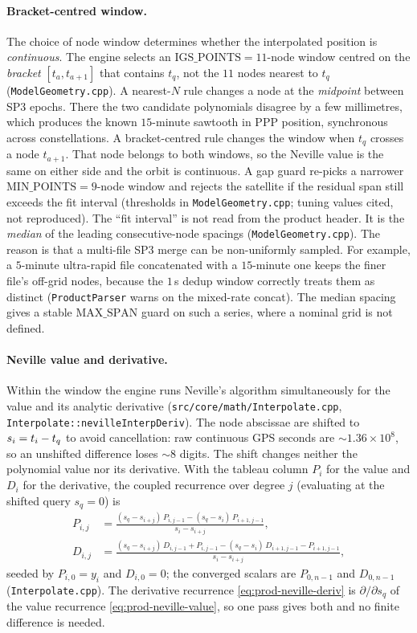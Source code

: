 \documentclass[main.tex]{subfiles}
\begin{document}
\paragraph{Bracket-centred window.}
The choice of node window determines whether the interpolated position
is \emph{continuous}.  The engine selects an
$\mathrm{IGS\_POINTS}=11$-node window centred on the \emph{bracket}
$[t_a,t_{a+1}]$ that contains $t_q$, not the $11$ nodes nearest to $t_q$
(\texttt{ModelGeometry.cpp}).  A nearest-$N$ rule changes a node at the
\emph{midpoint} between SP3 epochs.  There the two candidate polynomials
disagree by a few millimetres, which produces the known $15$-minute
sawtooth in PPP position, synchronous across constellations.  A
bracket-centred rule changes the window when $t_q$ crosses a node
$t_{a+1}$.  That node belongs to both windows, so the Neville value is
the same on either side and the orbit is continuous.  A gap guard
re-picks a narrower $\mathrm{MIN\_POINTS}=9$-node window and rejects
the satellite if the residual span still exceeds the fit interval
(thresholds in \texttt{ModelGeometry.cpp}; tuning values cited, not
reproduced).  The ``fit interval'' is not read from the product header.
It is the \emph{median} of the leading consecutive-node spacings
(\texttt{ModelGeometry.cpp}).  The reason is that a multi-file SP3 merge
can be non-uniformly sampled.  For example, a $5$-minute ultra-rapid
file concatenated with a $15$-minute one keeps the finer file's off-grid
nodes, because the $1$\,s dedup window correctly treats them as distinct
(\texttt{ProductParser} warns on the mixed-rate concat).  The median
spacing gives a stable $\mathrm{MAX\_SPAN}$ guard on such a series,
where a nominal grid is not defined.

\paragraph{Neville value and derivative.}
Within the window the engine runs Neville's algorithm
simultaneously for the value and its analytic derivative
(\texttt{src/core/math/Interpolate.cpp},
\texttt{Interpolate::nevilleInterpDeriv}).  The node abscissae are
shifted to $s_{i}=t_{i}-t_q$ to avoid cancellation: raw continuous
GPS seconds are $\sim\!1.36\times10^8$, so an unshifted difference loses
$\sim\!8$ digits.  The shift changes neither the polynomial value nor
its derivative.  With
the tableau column $P_{i}$ for the value and $D_{i}$ for the derivative,
the coupled recurrence over degree $j$ (evaluating at the shifted query
$s_q=0$) is
\begin{align}
P_{i,j}
&=
\frac{(s_q-s_{i+j})\,P_{i,j-1}-(s_q-s_i)\,P_{i+1,j-1}}
     {s_i-s_{i+j}},
\label{eq:prod-neville-value}\\[4pt]
D_{i,j}
&=
\frac{(s_q-s_{i+j})\,D_{i,j-1}+P_{i,j-1}
       -(s_q-s_i)\,D_{i+1,j-1}-P_{i+1,j-1}}
     {s_i-s_{i+j}},
\label{eq:prod-neville-deriv}
\end{align}
seeded by $P_{i,0}=y_i$ and $D_{i,0}=0$; the converged scalars are
$P_{0,n-1}$ and $D_{0,n-1}$ (\texttt{Interpolate.cpp}).  The derivative
recurrence \eqref{eq:prod-neville-deriv} is $\partial/\partial s_q$ of
the value recurrence \eqref{eq:prod-neville-value}, so one pass gives
both and no finite difference is needed.
\end{document}

